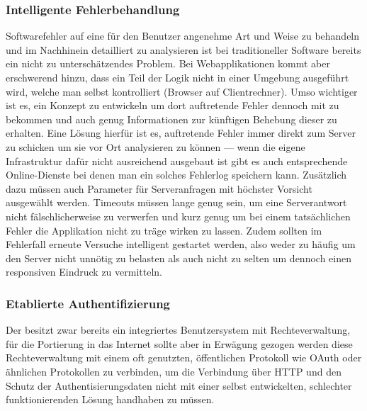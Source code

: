 \subsubsection{Intelligente Fehlerbehandlung}
Softwarefehler auf eine für den Benutzer angenehme Art und Weise zu behandeln und im Nachhinein detailliert zu analysieren ist bei traditioneller Software bereits ein nicht zu unterschätzendes Problem. Bei Webapplikationen kommt aber erschwerend hinzu, dass ein Teil der Logik nicht in einer Umgebung ausgeführt wird, welche man selbst kontrolliert (Browser auf Clientrechner). Umso wichtiger ist es, ein Konzept zu entwickeln um dort auftretende Fehler dennoch mit zu bekommen und auch genug Informationen zur künftigen Behebung dieser zu erhalten. Eine Lösung hierfür ist es, auftretende Fehler immer direkt zum Server zu schicken um sie vor Ort analysieren zu können --- wenn die eigene Infrastruktur dafür nicht ausreichend ausgebaut ist gibt es auch entsprechende Online-Dienste bei denen man ein solches Fehlerlog speichern kann. Zusätzlich dazu müssen auch Parameter für Serveranfragen mit höchster Vorsicht ausgewählt werden. Timeouts müssen lange genug sein, um eine Serverantwort nicht fälschlicherweise zu verwerfen und kurz genug um bei einem tatsächlichen Fehler die Applikation nicht zu träge wirken zu lassen. Zudem sollten im Fehlerfall erneute Versuche intelligent gestartet werden, also weder zu häufig um den Server nicht unnötig zu belasten als auch nicht zu selten um dennoch einen responsiven Eindruck zu vermitteln.

\subsubsection{Etablierte Authentifizierung}
Der  besitzt zwar bereits ein integriertes Benutzersystem mit Rechteverwaltung, für die Portierung in das Internet sollte aber in Erwägung gezogen werden diese Rechteverwaltung mit einem oft genutzten, öffentlichen Protokoll wie OAuth oder ähnlichen Protokollen zu verbinden, um die Verbindung über HTTP und den Schutz der Authentisierungsdaten nicht mit einer selbst entwickelten, schlechter funktionierenden Lösung handhaben zu müssen.

